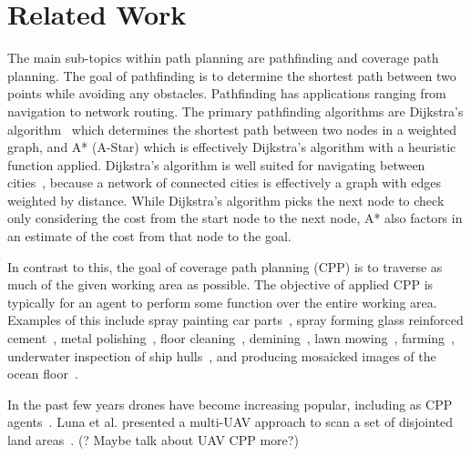 \chapter{Related Work}

The main sub-topics within path planning are pathfinding and coverage path planning.
The goal of pathfinding is to determine the shortest path between two points while avoiding any obstacles.
Pathfinding has applications ranging from navigation to network routing.
The primary pathfinding algorithms are Dijkstra's algorithm~\cite{Dijkstra, Improved_Dijkstra} which determines the shortest path between two nodes in a weighted graph, and A* (A-Star)\cite{A_Star_lit_review, A_Star_beginners, A_Star_in_computer_games} which is effectively Dijkstra's algorithm with a heuristic function applied.
Dijkstra's algorithm is well suited for navigating between cities~\cite{Dijkstra_for_railroads}, because a network of connected cities is effectively a graph with edges weighted by distance.
While Dijkstra's algorithm picks the next node to check only considering the cost from the start node to the next node, A* also factors in an estimate of the cost from that node to the goal.

In contrast to this, the goal of coverage path planning (CPP) is to traverse as much of the given working area as possible.
The objective of applied CPP is typically for an agent to perform some function over the entire working area.
Examples of this include spray painting car parts~\cite{Automatic_spray_painting_path}, spray forming glass reinforced cement~\cite{Robotic_grc_spraying}, metal polishing~\cite{Metal_polishing_robot_sys}, floor cleaning~\cite{CCPP_guidance_for_cleaning_robots}, demining~\cite{CPP_demining}, lawn mowing~\cite{CPP_autonomous_lawn_mower}, farming~\cite{Vision_perception_auto_harvester, CPP_alg_agriculture}, underwater inspection of ship hulls~\cite{CPP_inspect_complex_structures}, and producing mosaicked images of the ocean floor~\cite{Terrain_covering_AUV}.

In the past few years drones have become increasing popular, including as CPP agents~\cite{CPP_UAV_survey, CPP_2D_convex_regions_uav, CPP_multi_UAV, CPP_spraying_drones}.
Luna et al. presented a multi-UAV approach to scan a set of disjointed land areas~\cite{CPP_multi_UAV}.
(? Maybe talk about UAV CPP more?)

